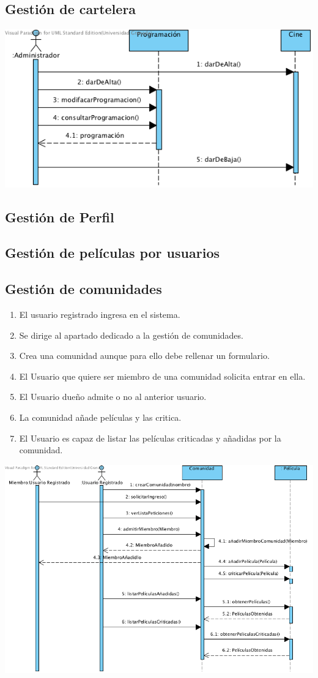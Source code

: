 \documentclass{article}
\begin{document}
	\subsection*{Gestión de cartelera}
	
			\includegraphics[width=1\linewidth]{./Sec-Cartelera}

	\subsection*{Gestión de Perfil}
	\subsection*{Gestión de películas por usuarios}
	\subsection*{Gestión de comunidades}
	\begin{enumerate}
		\item El usuario registrado ingresa en el sistema.
		\item Se dirige al apartado dedicado a la gestión de comunidades.
		\item Crea una comunidad aunque para ello debe rellenar un formulario.
		\item El Usuario que quiere ser miembro de una comunidad solicita entrar en ella.
		\item El Usuario dueño admite o no al anterior usuario.
		\item La comunidad añade películas y las critica.
		\item El Usuario es capaz de listar las películas criticadas y añadidas por la comunidad.
	\end{enumerate}
		\includegraphics[width=1\linewidth]{./S-Comunidades}
\end{document}
